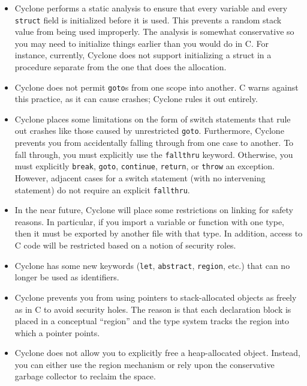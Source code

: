 \begin{itemize}
\item Cyclone performs a static analysis to ensure that every variable
  and every \texttt{struct} field is initialized before it is used. This
  prevents a random stack value from being used improperly. The
  analysis is somewhat conservative so you may need to initialize
  things earlier than you would do in C\@. For instance, currently,
  Cyclone does not support initializing a struct in a procedure
  separate from the one that does the allocation.

\item Cyclone does not permit \texttt{goto}s from one scope into
  another. C warns against this practice, as it can cause crashes;
  Cyclone rules it out entirely.

\item Cyclone places some limitations on the form of switch statements
  that rule out crashes like those caused by unrestricted
  \texttt{goto}.  Furthermore, Cyclone prevents you from accidentally
  falling through from one case to another. To fall through, you must
  explicitly use the \texttt{fallthru} keyword.  Otherwise, you must
  explicitly \texttt{break}, \texttt{goto}, \texttt{continue},
  \texttt{return}, or \texttt{throw} an exception.  However, adjacent
  cases for a switch statement (with no intervening statement) do
  not require an explicit \texttt{fallthru}.

\item In the near future, Cyclone will place some restrictions on
  linking for safety reasons. In particular, if you import a variable
  or function with one type, then it must be exported by another file
  with that type. In addition, access to C code will be restricted
  based on a notion of security roles.

\item Cyclone has some new keywords (\texttt{let}, \texttt{abstract},
  \texttt{region}, etc.) that can no longer be used as identifiers.

\item Cyclone prevents you from using pointers to stack-allocated
  objects as freely as in C to avoid security holes. The reason is
  that each declaration block is placed in a conceptual ``region'' and
  the type system tracks the region into which a pointer points.

\item Cyclone does not allow you to explicitly free a heap-allocated
  object. Instead, you can either use the region mechanism or rely
  upon the conservative garbage collector to reclaim the space.

\end{itemize}

